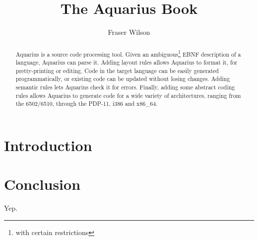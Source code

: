 \documentclass{article}
\title{The Aquarius Book}
\author{Fraser Wilson}
\begin{document}
\maketitle
\tableofcontents
\listoffigures
\listoftables
\lstset{language=Ada}

\begin{abstract}
Aquarius is a source code processing tool.  Given an
ambiguous\footnote{with certain restrictions} EBNF description of a
language, Aquarius can parse it.  Adding layout rules allows Aquarius
to format it, for pretty-printing or editing.  Code in the target
language can be easily generated programmatically, or existing code
can be updated without losing changes.  Adding semantic rules
lets Aquarius check it for errors.  Finally, adding some abstract
coding rules allows Aquarius to generate code for a wide variety of
architectures, ranging from the 6502/6510, through the PDP-11, i386
and x86\_64.
\end{abstract}

\section{Introduction}



\section{Conclusion}

Yep.




\printindex
\end{document}
